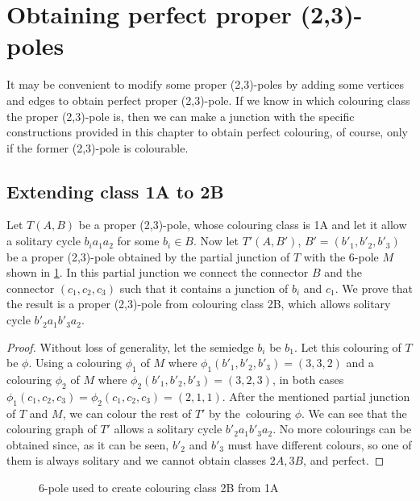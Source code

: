 \section{Obtaining perfect proper (2,3)-poles}\label{sec:classes-to-perfect}

It may be convenient to modify some proper (2,3)-poles by adding some vertices and edges to obtain perfect proper (2,3)-pole. If we know in which colouring class the proper (2,3)-pole is, then we can make a junction with the specific constructions provided in this chapter to obtain perfect colouring, of course, only if the former (2,3)-pole is colourable. 

\subsection{Extending class 1A to 2B}

Let $T(A,B)$ be a proper (2,3)-pole, whose colouring class is 1A and let it allow a solitary cycle $b_ia_1a_2$ for some $b_i\in B$. Now let $T'(A,B')$, $B'=(b'_1, b'_2, b'_3)$ be a proper (2,3)-pole obtained by the partial junction of $T$ with the 6-pole $M$ shown in \cref{fig:1A2B}. In this partial junction we connect the connector $B$ and the connector $(c_1,c_2,c_3)$ such that it contains a junction of $b_i$ and $c_1$. We prove that the result is a proper (2,3)-pole from colouring class 2B, which allows solitary cycle $b'_2a_1b'_3a_2$.

\begin{proof}
	Without loss of generality, let the semiedge $b_i$ be $b_1$. Let this colouring of $T$ be $\phi$. Using a colouring $\phi_1$ of $M$ where $\phi_1(b'_1,b'_2,b'_3)=(3,3,2)$ and a colouring $\phi_2$ of $M$ where $\phi_2(b'_1,b'_2,b'_3)=(3,2,3)$, in both cases $\phi_1(c_1,c_2,c_3)=\phi_2(c_1,c_2,c_3)=(2,1,1)$. After the mentioned partial junction of $T$ and $M$, we can colour the rest of $T'$ by the~colouring $\phi$. We can see that the colouring graph of $T'$ allows a solitary cycle $b'_2a_1b'_3a_2$. No more colourings can be obtained since, as it can be seen, $b'_2$ and $b'_3$ must have different colours, so one of them is always solitary and we cannot obtain classes $2A,3B$, and perfect.
\end{proof}

\begin{figure}
	\centering
	
	\caption{6-pole used to create colouring class 2B from 1A}
	\label{fig:1A2B}
\end{figure}

